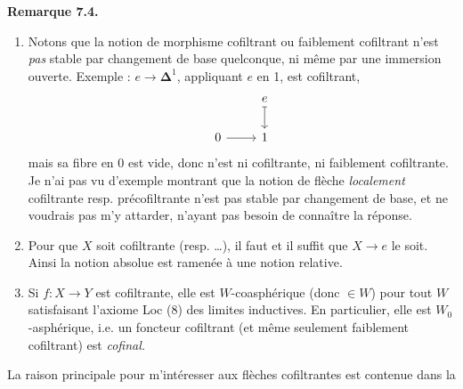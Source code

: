 \documentclass[11pt]{article}
\newcommand{\printedpage}[1]{\marginpar{\footnotesize p.~#1}}
\newcommand{\msp}[1]{\marginpar{\footnotesize [#1]}}
\begin{document}
\printedpage{57}
\textbf{Remarque 7.4.}
\begin{enumerate}
\item[1)] Notons que la notion de morphisme cofiltrant ou faiblement cofiltrant n'est \textit{pas} stable par changement de base quelconque, ni même par une immersion ouverte. Exemple : $e \longrightarrow \boldsymbol{\Delta}^1$, appliquant $e$ en 1, est cofiltrant,
\[
\begin{tikzcd}
 & e \arrow[d, mapsto] \\
0 \arrow[r] & 1
\end{tikzcd}
\]
mais sa fibre en 0 est vide, donc n'est ni cofiltrante, ni faiblement cofiltrante. Je n'ai pas vu d'exemple montrant que la notion de flèche \textit{localement} cofiltrante resp. précofiltrante n'est pas stable par changement de base, et ne voudrais pas m'y attarder, n'ayant pas besoin de connaître la réponse.
\item[2)] Pour que $X$ soit cofiltrante (resp. \dots), il faut et il suffit que $X \longrightarrow e$ le soit. Ainsi la notion absolue est ramenée à une notion relative.
\item[3)] Si $f : X \longrightarrow Y$ est cofiltrante, elle est \msp{page 92} $W$-coasphérique (donc $\in W$) pour tout $W$ satisfaisant l'axiome Loc (8) des limites inductives. En particulier, elle est $W_0$-asphérique, i.e. un foncteur cofiltrant (et même seulement faiblement cofiltrant) est \textit{cofinal.}
\end{enumerate}
La raison principale pour m'intéresser aux flèches cofiltrantes est contenue dans la
\end{document}
